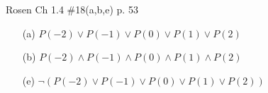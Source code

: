 \documentclass[12pt,addpoints]{exam}
\begin{document}
\begin{questions}
\question[6] Rosen Ch 1.4 \#18(a,b,e) p. 53
%
    \begin{solution}
    \begin{itemize}
        \item[(a)] $P(-2) \vee P(-1) \vee P(0) \vee P(1) \vee P(2)$
        \item[(b)] $P(-2) \wedge P(-1) \wedge P(0) \wedge P(1) \wedge P(2)$
        \item[(e)] $\neg (P(-2) \vee P(-1) \vee P(0) \vee P(1) \vee P(2))$
    \end{itemize}
    \end{solution}



\end{questions}
\end{document}

